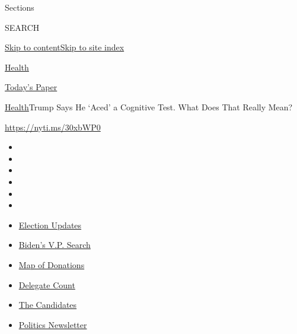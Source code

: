 Sections

SEARCH

\protect\hyperlink{site-content}{Skip to
content}\protect\hyperlink{site-index}{Skip to site index}

\href{https://www.nytimes.com/section/health}{Health}

\href{https://myaccount.nytimes.com/auth/login?response_type=cookie\&client_id=vi}{}

\href{https://www.nytimes.com/section/todayspaper}{Today's Paper}

\href{/section/health}{Health}\textbar{}Trump Says He `Aced' a Cognitive
Test. What Does That Really Mean?

\url{https://nyti.ms/30xbWP0}

\begin{itemize}
\item
\item
\item
\item
\item
\item
\end{itemize}

\begin{itemize}
\item
  \href{https://www.nytimes.com/2020/07/31/us/elections/biden-vs-trump.html?action=click\&pgtype=Article\&state=default\&region=TOP_BANNER\&context=storylines_menu}{Election
  Updates}
\item
  \href{https://www.nytimes.com/article/biden-vice-president-2020.html?action=click\&pgtype=Article\&state=default\&region=TOP_BANNER\&context=storylines_menu}{Biden's
  V.P. Search}
\item
  \href{https://www.nytimes.com/interactive/2020/07/24/us/politics/trump-biden-campaign-donors.html?action=click\&pgtype=Article\&state=default\&region=TOP_BANNER\&context=storylines_menu}{Map
  of Donations}
\item
  \href{https://www.nytimes.com/interactive/2020/us/elections/delegate-count-primary-results.html?action=click\&pgtype=Article\&state=default\&region=TOP_BANNER\&context=storylines_menu}{Delegate
  Count}
\item
  \href{https://www.nytimes.com/interactive/2019/us/politics/2020-presidential-candidates.html?action=click\&pgtype=Article\&state=default\&region=TOP_BANNER\&context=storylines_menu}{The
  Candidates}
\item
  \href{https://www.nytimes.com/newsletters/politics?action=click\&pgtype=Article\&state=default\&region=TOP_BANNER\&context=storylines_menu}{Politics
  Newsletter}
\end{itemize}

